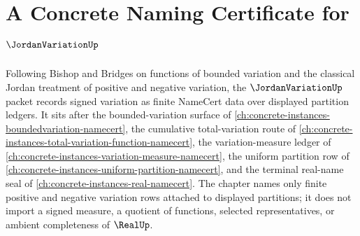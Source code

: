 \chapter{A Concrete Naming Certificate for $\JordanVariationUp$}
\label{ch:concrete-instances-jordan-variation-namecert}

Following Bishop and Bridges on functions of bounded variation and the classical Jordan treatment of positive and negative variation, the $\JordanVariationUp$ packet records signed variation as finite NameCert data over displayed partition ledgers. It sits after the bounded-variation surface of \autoref{ch:concrete-instances-boundedvariation-namecert}, the cumulative total-variation route of \autoref{ch:concrete-instances-total-variation-function-namecert}, the variation-measure ledger of \autoref{ch:concrete-instances-variation-measure-namecert}, the uniform partition row of \autoref{ch:concrete-instances-uniform-partition-namecert}, and the terminal real-name seal of \autoref{ch:concrete-instances-real-namecert}. The chapter names only finite positive and negative variation rows attached to displayed partitions; it does not import a signed measure, a quotient of functions, selected representatives, or ambient completeness of $\RealUp$.

